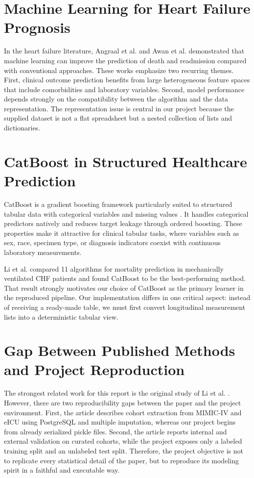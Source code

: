 \documentclass[a4paper,12pt]{extreport}
\begin{document}
\section{Machine Learning for Heart Failure Prognosis}
In the heart failure literature, Angraal et al. \cite{angraal2020machine} and Awan et al. \cite{awan2019machine} demonstrated that machine learning can improve the prediction of death and readmission compared with conventional approaches. These works emphasize two recurring themes. First, clinical outcome prediction benefits from large heterogeneous feature spaces that include comorbidities and laboratory variables. Second, model performance depends strongly on the compatibility between the algorithm and the data representation. The representation issue is central in our project because the supplied dataset is not a flat spreadsheet but a nested collection of lists and dictionaries.

\section{CatBoost in Structured Healthcare Prediction}
CatBoost is a gradient boosting framework particularly suited to structured tabular data with categorical variables and missing values \cite{hancock2020catboost,prokhorenkova2018catboost}. It handles categorical predictors natively and reduces target leakage through ordered boosting. These properties make it attractive for clinical tabular tasks, where variables such as sex, race, specimen type, or diagnosis indicators coexist with continuous laboratory measurements.

Li et al. \cite{li2022prediction} compared 11 algorithms for mortality prediction in mechanically ventilated CHF patients and found CatBoost to be the best-performing method. That result strongly motivates our choice of CatBoost as the primary learner in the reproduced pipeline. Our implementation differs in one critical aspect: instead of receiving a ready-made table, we must first convert longitudinal measurement lists into a deterministic tabular view.

\section{Gap Between Published Methods and Project Reproduction}
The strongest related work for this report is the original study of Li et al. \cite{li2022prediction}. However, there are two reproducibility gaps between the paper and the project environment. First, the article describes cohort extraction from MIMIC-IV and eICU using PostgreSQL and multiple imputation, whereas our project begins from already serialized pickle files. Second, the article reports internal and external validation on curated cohorts, while the project exposes only a labeled training split and an unlabeled test split. Therefore, the project objective is not to replicate every statistical detail of the paper, but to reproduce its modeling spirit in a faithful and executable way.
\end{document}
